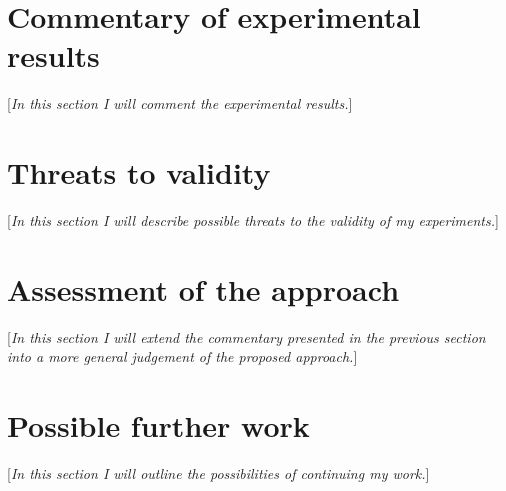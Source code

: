 \documentclass{pracamgr}
\begin{document}
\section{Commentary of experimental results}
\label{sec:commentary}
[\textit{In this section I will comment the experimental results.}]

\section{Threats to validity}
\label{sec:threats}
[\textit{In this section I will describe possible threats to the validity of my experiments.}]

\section{Assessment of the approach}
\label{sec:assessment}
[\textit{In this section I will extend the commentary presented in the previous section into a more general judgement of the proposed approach.}]

\section{Possible further work}
\label{sec:further_work}
[\textit{In this section I will outline the possibilities of continuing my work.}]

\printbibliography[heading=bibintoc]
\end{document}
